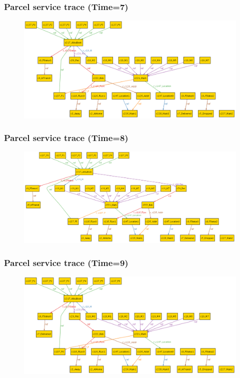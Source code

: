 \documentclass[xcolor=dvipsnames,mathserif,12pt,backend=biber]{beamer}
\begin{document}
  \begin{frame}
    \frametitle{Parcel service trace (Time=7)}
\begin{figure}
\includegraphics[width=1.1 \textwidth]{Figures/Shipping_Time7.png}
\end{figure}
  \end{frame}
  \begin{frame}
    \frametitle{Parcel service trace (Time=8)}
\begin{figure}
\includegraphics[width=1.1 \textwidth]{Figures/Shipping_Time8.png}
\end{figure}
  \end{frame}
  \begin{frame}
    \frametitle{Parcel service trace (Time=9)}
\begin{figure}
\includegraphics[width=1.1 \textwidth]{Figures/Shipping_Time9.png}
\end{figure}
  \end{frame}
\end{document}
